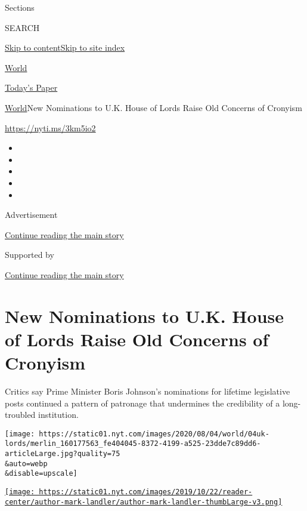 Sections

SEARCH

\protect\hyperlink{site-content}{Skip to
content}\protect\hyperlink{site-index}{Skip to site index}

\href{https://www.nytimes.com/section/world}{World}

\href{https://myaccount.nytimes.com/auth/login?response_type=cookie\&client_id=vi}{}

\href{https://www.nytimes.com/section/todayspaper}{Today's Paper}

\href{/section/world}{World}\textbar{}New Nominations to U.K. House of
Lords Raise Old Concerns of Cronyism

\url{https://nyti.ms/3km5io2}

\begin{itemize}
\item
\item
\item
\item
\item
\end{itemize}

Advertisement

\protect\hyperlink{after-top}{Continue reading the main story}

Supported by

\protect\hyperlink{after-sponsor}{Continue reading the main story}

\hypertarget{new-nominations-to-uk-house-of-lords-raise-old-concerns-of-cronyism}{%
\section{New Nominations to U.K. House of Lords Raise Old Concerns of
Cronyism}\label{new-nominations-to-uk-house-of-lords-raise-old-concerns-of-cronyism}}

Critics say Prime Minister Boris Johnson's nominations for lifetime
legislative posts continued a pattern of patronage that undermines the
credibility of a long-troubled institution.

\texttt{[image: https://static01.nyt.com/images/2020/08/04/world/04uk-lords/merlin\_160177563\_fe404045-8372-4199-a525-23dde7c89dd6-articleLarge.jpg?quality=75\\\&auto=webp\\\&disable=upscale]}

\href{https://www.nytimes.com/by/mark-landler}{\texttt{[image: https://static01.nyt.com/images/2019/10/22/reader-center/author-mark-landler/author-mark-landler-thumbLarge-v3.png]}}

